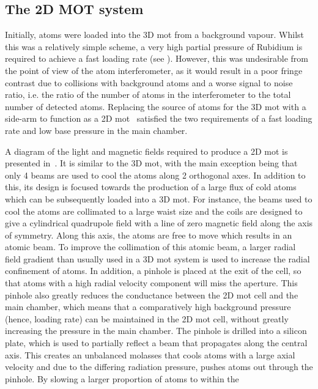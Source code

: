 \subsection{The 2D MOT system}\label{sec:2d_mot}
Initially, atoms were loaded into the 3D \ac{mot} from a background vapour.
Whilst this was a relatively simple scheme, a very high partial pressure of
Rubidium is required to achieve a fast loading rate (see
). However, this was undesirable from the point
of view of the atom interferometer, as it would result in a poor fringe contrast
due to collisions with background atoms and a worse signal to noise ratio, i.e.
the ratio of the number of atoms in the interferometer to the total number of
detected atoms. Replacing the source of atoms for the 3D
\ac{mot} with a side-arm to function as a 2D \ac{mot}~\cite{Dieckmann1998}
satisfied the two requirements of a fast loading rate and low base pressure in
the main chamber. \par\noindent A diagram of the light and magnetic fields
required to produce a 2D \ac{mot} is presented
in~. It is similar to the 3D \ac{mot}, with the
main exception being that only 4 beams are used to cool the atoms along 2
orthogonal axes. In addition to this, its design is focused towards the
production of a large flux of cold atoms which can be subsequently loaded into a
3D \ac{mot}. For instance, the beams used to cool the atoms are collimated to a
large waist size and the coils are designed to give a cylindrical quadrupole
field with a line of zero magnetic field along the axis of symmetry. Along this
axis, the atoms are free to move which results in an atomic beam. To improve the
collimation of this atomic beam, a larger radial field gradient than usually
used in a 3D \ac{mot} system is used to increase the radial confinement of
atoms. In addition, a pinhole is placed at the exit of the cell, so that atoms
with a high radial velocity component will miss the aperture. This pinhole also
greatly reduces the conductance between the 2D \ac{mot} cell and the main
chamber, which means that a comparatively high background pressure (hence,
loading rate) can be maintained in the 2D \ac{mot} cell, without greatly
increasing the pressure in the main chamber. The pinhole is drilled into a
silicon plate, which is used to partially reflect a beam that propagates along
the central axis. This creates an unbalanced molasses that cools atoms with a
large axial velocity and due to the differing radiation pressure, pushes atoms
out through the pinhole. By slowing a larger proportion of atoms to within the
